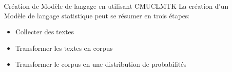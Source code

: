 \begin{frame}{Création de Modèle de langage en utilisant CMUCLMTK}
La création d'un Modèle de langage statistique peut se résumer en trois étapes:
\begin{itemize}
\item Collecter des textes
\item Transformer les textes en corpus
\item Transformer le corpus en une distribution de probabilités
\end{itemize}
\end{frame}

